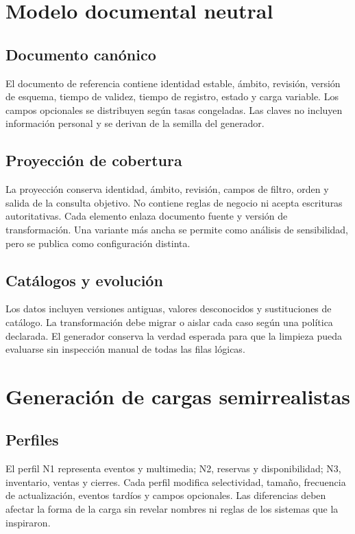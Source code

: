 \chapter{Modelo documental neutral}

\section{Documento canónico}

El documento de referencia contiene identidad estable, ámbito, revisión, versión de
esquema, tiempo de validez, tiempo de registro, estado y carga variable. Los campos
opcionales se distribuyen según tasas congeladas. Las claves no incluyen información
personal y se derivan de la semilla del generador.

\section{Proyección de cobertura}

La proyección conserva identidad, ámbito, revisión, campos de filtro, orden y salida de
la consulta objetivo. No contiene reglas de negocio ni acepta escrituras autoritativas.
Cada elemento enlaza documento fuente y versión de transformación. Una variante más
ancha se permite como análisis de sensibilidad, pero se publica como configuración
distinta.

\section{Catálogos y evolución}

Los datos incluyen versiones antiguas, valores desconocidos y sustituciones de catálogo.
La transformación debe migrar o aislar cada caso según una política declarada. El
generador conserva la verdad esperada para que la limpieza pueda evaluarse sin inspección
manual de todas las filas lógicas.

\chapter{Generación de cargas semirrealistas}

\section{Perfiles}

El perfil N1 representa eventos y multimedia; N2, reservas y disponibilidad; N3,
inventario, ventas y cierres. Cada perfil modifica selectividad, tamaño, frecuencia de
actualización, eventos tardíos y campos opcionales. Las diferencias deben afectar la
forma de la carga sin revelar nombres ni reglas de los sistemas que la inspiraron.

